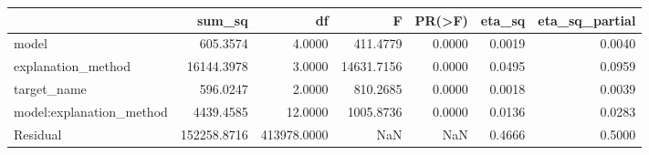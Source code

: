 \begin{tabular}{lrrrrrr}
\toprule
 & sum_sq & df & F & PR(>F) & eta_sq & eta_sq_partial \\
\midrule
model & 605.3574 & 4.0000 & 411.4779 & 0.0000 & 0.0019 & 0.0040 \\
explanation_method & 16144.3978 & 3.0000 & 14631.7156 & 0.0000 & 0.0495 & 0.0959 \\
target_name & 596.0247 & 2.0000 & 810.2685 & 0.0000 & 0.0018 & 0.0039 \\
model:explanation_method & 4439.4585 & 12.0000 & 1005.8736 & 0.0000 & 0.0136 & 0.0283 \\
Residual & 152258.8716 & 413978.0000 & NaN & NaN & 0.4666 & 0.5000 \\
\bottomrule
\end{tabular}
